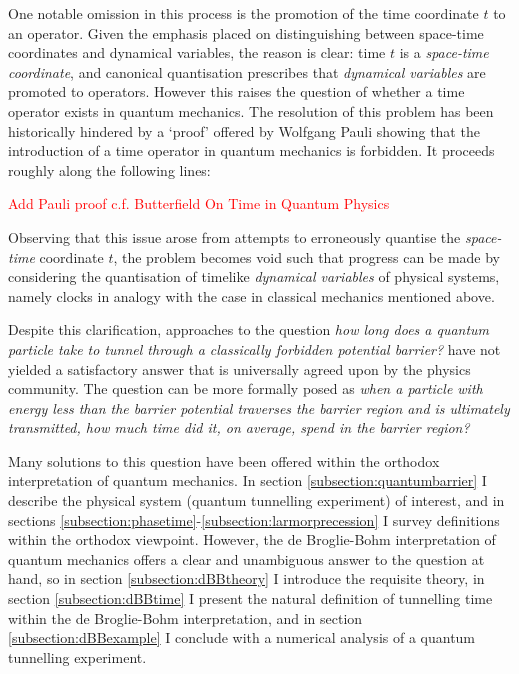 \documentclass{article}
\begin{document}
\noindent One notable omission in this process is the promotion of the time coordinate $t$ to an operator. Given the emphasis placed on distinguishing between space-time coordinates and dynamical variables, the reason is clear: time $t$ is a \textit{space-time coordinate}, and canonical quantisation prescribes that \textit{dynamical variables} are promoted to operators. However this raises the question of whether a time operator exists in quantum mechanics. The resolution of this problem has been historically hindered by a `proof' offered by Wolfgang Pauli showing that the introduction of a time operator in quantum mechanics is forbidden. It proceeds roughly along the following lines:

\textcolor{red}{Add Pauli proof c.f. Butterfield On Time in Quantum Physics}

Observing that this issue arose from attempts to erroneously quantise the \textit{space-time} coordinate $t$, the problem becomes void such that progress can be made by considering the quantisation of timelike \textit{dynamical variables} of physical systems, namely clocks in analogy with the case in classical mechanics mentioned above. 

Despite this clarification, approaches to the question \textit{how long does a quantum particle take to tunnel through a classically forbidden potential barrier?} have not yielded a satisfactory answer that is universally agreed upon by the physics community. The question can be more formally posed as \textit{when a particle with energy less than the barrier potential traverses the barrier region and is ultimately transmitted, how much time did it, on average, spend in the barrier region?} 

Many solutions to this question have been offered within the orthodox interpretation of quantum mechanics. In section \ref{subsection:quantumbarrier} I describe the physical system (quantum tunnelling experiment) of interest, and in sections \ref{subsection:phasetime}-\ref{subsection:larmorprecession} I survey definitions within the orthodox viewpoint. However, the de Broglie-Bohm interpretation of quantum mechanics offers a clear and unambiguous answer to the question at hand, so in section \ref{subsection:dBBtheory} I introduce the requisite theory, in section \ref{subsection:dBBtime} I present the natural definition of tunnelling time within the de Broglie-Bohm interpretation, and in section \ref{subsection:dBBexample} I conclude with a numerical analysis of a quantum tunnelling experiment.
\end{document}
